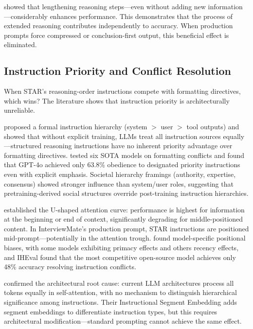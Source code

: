 \documentclass[11pt]{article}
\begin{document}
\citet{jin2024} showed that lengthening reasoning steps---even without adding new information---considerably enhances performance. This demonstrates that the process of extended reasoning contributes independently to accuracy. When production prompts force compressed or conclusion-first output, this beneficial effect is eliminated.

\subsection{Instruction Priority and Conflict Resolution}

When STAR's reasoning-order instructions compete with formatting directives, which wins? The literature shows that instruction priority is architecturally unreliable.

\citet{wallace2024} proposed a formal instruction hierarchy (system $>$ user $>$ tool outputs) and showed that without explicit training, LLMs treat all instruction sources equally---structured reasoning instructions have no inherent priority advantage over formatting directives. \citet{geng2025} tested six SOTA models on formatting conflicts and found that GPT-4o achieved only 63.8\% obedience to designated priority instructions even with explicit emphasis. Societal hierarchy framings (authority, expertise, consensus) showed stronger influence than system/user roles, suggesting that pretraining-derived social structures override post-training instruction hierarchies.

\citet{liu2024} established the U-shaped attention curve: performance is highest for information at the beginning or end of context, significantly degrading for middle-positioned content. In InterviewMate's production prompt, STAR instructions are positioned mid-prompt---potentially in the attention trough. \citet{purpura2026} found model-specific positional biases, with some models exhibiting primacy effects and others recency effects, and IHEval \citep{iheval2025} found that the most competitive open-source model achieves only 48\% accuracy resolving instruction conflicts.

\citet{wu2025} confirmed the architectural root cause: current LLM architectures process all tokens equally in self-attention, with no mechanism to distinguish hierarchical significance among instructions. Their Instructional Segment Embedding adds segment embeddings to differentiate instruction types, but this requires architectural modification---standard prompting cannot achieve the same effect.
\end{document}
